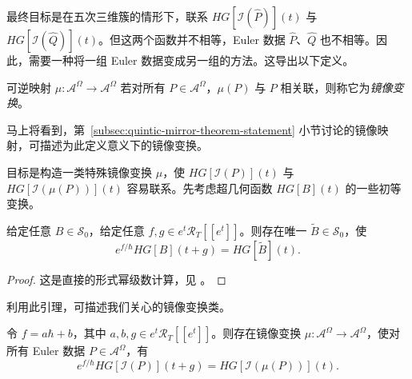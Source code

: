 最终目标是在五次三维簇的情形下，联系 $HG[\mathcal I(\widehat P)](t)$ 与 $HG[\mathcal I(\widehat Q)](t)$。但这两个函数并不相等，Euler 数据 $\widehat P$、$\widehat Q$ 也不相等。因此，需要一种将一组 Euler 数据变成另一组的方法。这导出以下定义。
\begin{definition}\label{def:euler-data-mirror-transformation}
可逆映射 $\mu:\mathcal A^\Omega\to\mathcal A^\Omega$ 若对所有 $P\in\mathcal A^\Omega$，$\mu(P)$ 与 $P$ 相关联，则称它为\emph{镜像变换}。
\end{definition}
马上将看到，第~\ref{subsec:quintic-mirror-theorem-statement} 小节讨论的镜像映射，可描述为此定义意义下的镜像变换。

目标是构造一类特殊镜像变换 $\mu$，使 $HG[\mathcal I(P)](t)$ 与 $HG[\mathcal I(\mu(P))](t)$ 容易联系。先考虑超几何函数 $HG[B](t)$ 的一些初等变换。
\begin{lemma}\label{lem:hypergeometric-formal-transformation}
给定任意 $B\in\mathcal S_0$，给定任意 $f,g\in e^t\mathcal R_T[[e^t]]$。则存在唯一 $\widetilde B\in\mathcal S_0$，使
\[
e^{f/\hbar}HG[B](t+g)=HG[\widetilde B](t).
\]
\end{lemma}
\begin{proof}
这是直接的形式幂级数计算，见 。
\end{proof}
利用此引理，可描述我们关心的镜像变换类。
\begin{proposition}\label{prop:hypergeometric-mirror-transformation-lift}
令 $f=a\hbar+b$，其中 $a,b,g\in e^t\mathcal R_T[[e^t]]$。则存在镜像变换 $\mu:\mathcal A^\Omega\to\mathcal A^\Omega$，使对所有 Euler 数据 $P\in\mathcal A^\Omega$，有
\[
e^{f/\hbar}HG[\mathcal I(P)](t+g)=HG[\mathcal I(\mu(P))](t).
\]
\end{proposition}
